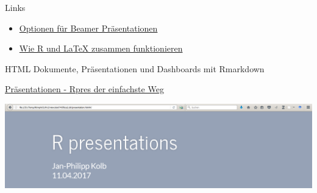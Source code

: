 \documentclass[ignorenonframetext,]{beamer}
\begin{document}
\begin{frame}{Links}

\begin{itemize}
\item
  \href{http://rmarkdown.rstudio.com/beamer_presentation_format.html}{Optionen
  für Beamer Präsentationen}
\item
  \href{https://www.r-bloggers.com/from-openoffice-noob-to-control-freak-a-love-story-with-r-latex-and-knitr/}{Wie
  R und LaTeX zusammen funktionieren}
\end{itemize}

\end{frame}

\begin{frame}{HTML Dokumente, Präsentationen und Dashboards mit
Rmarkdown}

\end{frame}

\begin{frame}{\href{https://rstudio-pubs-static.s3.amazonaws.com/27777_55697c3a476640caa0ad2099fe914ae5.html\#/}{Präsentationen
- Rpres der einfachste Weg}}

\includegraphics{./tex2pdf.956/826168065f46aef1f3f31ea59c3eaa9eff8f6c6e.png}

\end{frame}
\end{document}
